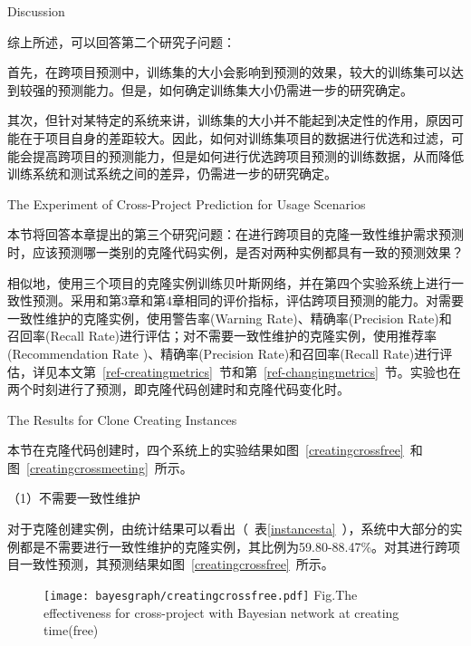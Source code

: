 {Discussion}

综上所述，可以回答第二个研究子问题：

首先，在跨项目预测中，训练集的大小会影响到预测的效果，较大的训练集可以达到较强的预测能力。但是，如何确定训练集大小仍需进一步的研究确定。

其次，但针对某特定的系统来讲，训练集的大小并不能起到决定性的作用，原因可能在于项目自身的差距较大。因此，如何对训练集项目的数据进行优选和过滤，可能会提高跨项目的预测能力，但是如何进行优选跨项目预测的训练数据，从而降低训练系统和测试系统之间的差异，仍需进一步的研究确定。

{The Experiment of Cross-Project Prediction for Usage Scenarios}

本节将回答本章提出的第三个研究问题：在进行跨项目的克隆一致性维护需求预测时，应该预测哪一类别的克隆代码实例，是否对两种实例都具有一致的预测效果？

相似地，使用三个项目的克隆实例训练贝叶斯网络，并在第四个实验系统上进行一致性预测。采用和第3章和第4章相同的评价指标，评估跨项目预测的能力。对需要一致性维护的克隆实例，使用警告率(Warning Rate)、精确率(Precision Rate)和召回率(Recall Rate)进行评估；对不需要一致性维护的克隆实例，使用推荐率(Recommendation Rate )、精确率(Precision Rate)和召回率(Recall Rate)进行评估，详见本文第~\ref{ref-creatingmetrics}~节和第~\ref{ref-changingmetrics}~节。实验也在两个时刻进行了预测，即克隆代码创建时和克隆代码变化时。

{The Results for Clone Creating Instances}

本节在克隆代码创建时，四个系统上的实验结果如图~\ref{creatingcrossfree}~和图~\ref{creatingcrossmeeting}~所示。

（1）不需要一致性维护

对于克隆创建实例，由统计结果可以看出（~表\ref{instancesta}~），系统中大部分的实例都是不需要进行一致性维护的克隆实例，其比例为59.80-88.47\%。对其进行跨项目一致性预测，其预测结果如图~\ref{creatingcrossfree}~所示。

\begin{figure}[htbp]
\centering
\texttt{[image: bayesgraph/creatingcrossfree.pdf]}
{Fig.$\!$}{The effectiveness for cross-project with Bayesian network at creating time(free)}
\vspace{-1em}
\end{figure}

